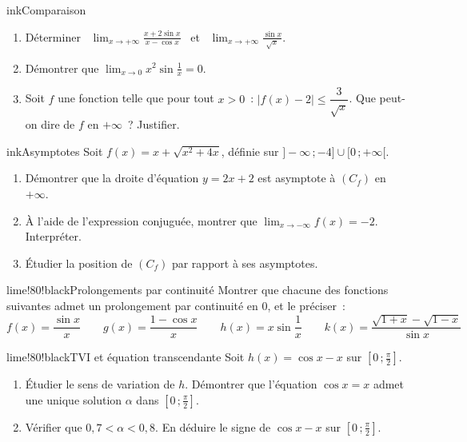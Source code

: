 \begin{exo}{ink}{Comparaison }
\begin{enumerate}
  \item Déterminer \ $\displaystyle\lim_{x\to+\infty}\frac{x+2\sin x}{x-\cos x}$ \ et \ $\displaystyle\lim_{x\to+\infty}\frac{\sin x}{\sqrt x}$.
  \item Démontrer que $\displaystyle\lim_{x\to0}x^2\sin\frac1x=0$.
  \item Soit $f$ une fonction telle que pour tout $x>0$~: $|f(x)-2|\leq\dfrac{3}{\sqrt x}$. Que peut-on dire de $f$ en $+\infty$~? Justifier.
\end{enumerate}
\end{exo}

\begin{exo}{ink}{Asymptotes }
Soit $f(x)=x+\sqrt{x^2+4x}$, définie sur $]-\infty\,;-4]\cup[0\,;+\infty[$.
\begin{enumerate}
  \item Démontrer que la droite d'équation $y=2x+2$ est asymptote à $(C_f)$ en $+\infty$.
  \item À l'aide de l'expression conjuguée, montrer que $\displaystyle\lim_{x\to-\infty}f(x)=-2$. Interpréter.
  \item Étudier la position de $(C_f)$ par rapport à ses asymptotes.
\end{enumerate}
\end{exo}


\begin{exo}{lime!80!black}{Prolongements par continuité }
Montrer que chacune des fonctions suivantes admet un prolongement par continuité en $0$, et le préciser~:
\[
f(x)=\frac{\sin x}{x}\qquad g(x)=\frac{1-\cos x}{x}\qquad h(x)=x\sin\frac1x\qquad k(x)=\frac{\sqrt{1+x}-\sqrt{1-x}}{\sin x}
\]
\end{exo}

\begin{exo}{lime!80!black}{TVI et équation transcendante }
Soit $h(x)=\cos x-x$ sur $\left[0\,;\frac\pi2\right]$.
\begin{enumerate}
  \item Étudier le sens de variation de $h$. Démontrer que l'équation $\cos x=x$ admet une unique solution $\alpha$ dans $\left[0\,;\frac\pi2\right]$.
  \item Vérifier que $0{,}7<\alpha<0{,}8$. En déduire le signe de $\cos x-x$ sur $\left[0\,;\frac\pi2\right]$.
\end{enumerate}
\end{exo}

